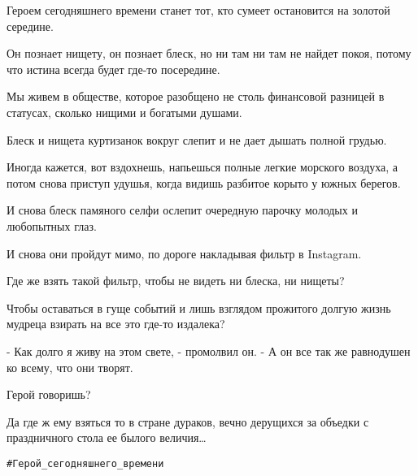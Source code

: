 Героем сегодняшнего времени станет тот, кто сумеет остановится на золотой
середине. 

Он познает нищету, он познает блеск, но ни там ни там не найдет покоя, потому
что истина всегда будет где-то посередине. 

Мы живем в обществе, которое разобщено не столь финансовой разницей в статусах,
сколько нищими и богатыми душами. 

Блеск и нищета куртизанок вокруг слепит и не дает дышать полной грудью. 

Иногда кажется, вот вздохнешь, напьешься полные легкие морского воздуха, а
потом снова приступ удушья, когда видишь разбитое корыто у южных берегов.

И снова блеск памяного селфи ослепит очередную парочку молодых и любопытных
глаз. 

И снова они пройдут мимо, по дороге накладывая фильтр в Instagram. 

Где же взять такой фильтр, чтобы не видеть ни блеска, ни нищеты?

Чтобы оставаться в гуще событий и лишь взглядом прожитого долгую жизнь мудреца
взирать на все это где-то издалека?

- Как долго я живу на этом свете, - промолвил он. - А он все так же равнодушен
ко всему, что они творят.

Герой говоришь?

Да где ж ему взяться то в стране дураков, вечно дерущихся за объедки с
праздничного стола ее былого величия… 

\verb|#Герой_сегодняшнего_времени|


